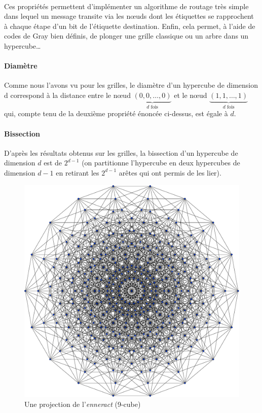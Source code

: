 \paragraph{}
Ces propriétés permettent d'implémenter un algorithme de routage très simple dans lequel un message transite via les nœuds dont les étiquettes se rapprochent à chaque étape d'un bit de l'étiquette destination. Enfin, cela permet, à l'aide de codes de Gray bien définis, de plonger une grille classique ou un arbre dans un hypercube…

\paragraph{Diamètre} Comme nous l'avons vu pour les grilles, le diamètre d'un hypercube de dimension d correspond à la distance entre le nœud $\underbrace{(0,0,…,0)}_{d \text{ fois}}$ et le nœud $\underbrace{(1,1,…,1)}_{d \text{ fois}}$ qui, compte tenu de la deuxième propriété énoncée ci-dessus, est égale à $d$.

\paragraph{Bissection} D'après les résultats obtenus sur les grilles, la bissection d'un hypercube de dimension $d$ est de $2^{d-1}$ (on partitionne l'hypercube en deux hypercubes de dimension $d-1$ en retirant les $2^{d-1}$ arêtes qui ont permis de les lier).


\begin{figure}[!h]
\centering
\includegraphics[scale=0.20]{images/q9.pdf}
\caption{Une projection de l'\textit{enneract} (9-cube)}
\end{figure}

